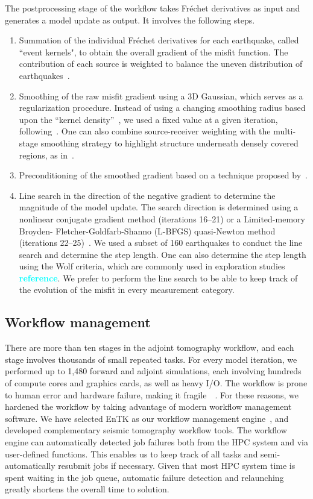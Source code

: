 \documentclass[extra,mreferee]{gji}
\newcommand{\cyan}[1]{\textbf{\textcolor{Cyan}{#1}}}
\begin{document}
The postprocessing stage of the workflow takes Fr\'echet derivatives as input and
generates a model update as output.
It involves the following steps.
\begin{enumerate}
  \item Summation of the individual Fr\'echet derivatives for each earthquake, called ``event kernels", to obtain the overall gradient of the misfit function. The contribution of each source is weighted to balance
    the uneven distribution of earthquakes~\citep{Ruanetal2018}.
  \item Smoothing of the raw misfit gradient using a 3D Gaussian, which
    serves as a regularization procedure. Instead of using a changing
    smoothing radius based upon the ``kernel density''~\citep{bozdaug2016global},
    we used a fixed value at a given iteration, following~\cite{zhu2012structure}. One can also combine source-receiver weighting with the multi-stage smoothing strategy to highlight structure underneath densely covered regions, as in~\citet{bozdaug2016global}.
  \item Preconditioning of the smoothed gradient based on a technique proposed by~\cite{luo2013strategies}.
  \item Line search in the direction of the negative gradient to determine the magnitude of the model update.
  The search direction is determined using a nonlinear conjugate gradient method (iterations 16--21) or a Limited-memory Broyden- Fletcher-Goldfarb-Shanno (L-BFGS) quasi-Newton method (iterations 22--25)~\citep{wright1999numerical}.
  We used a subset of 160 earthquakes to conduct the line search and determine the step length. One can also determine the step length using the Wolf criteria, which are commonly used in exploration studies \cyan{reference}. We prefer to perform the line search to be able to keep track of the evolution of the misfit in every measurement category.
\end{enumerate}

\subsection{Workflow management}

There are more than ten stages in the adjoint tomography workflow,
and each stage involves thousands of small repeated tasks.
For every model iteration,
we performed up to 1,480 forward and adjoint simulations, each involving hundreds of
compute cores and graphics cards, as well as heavy I/O.
The workflow is prone to human error and hardware failure, making it fragile~~\citep{Lefebvre2018}.
For these reasons, we hardened the workflow by taking advantage of modern
workflow management software.
We have selected EnTK as our
workflow management engine~\citep{EnTK2017}, and developed complementary seismic tomography
workflow tools.
The workflow engine can automatically detected job failures both from the
HPC system and via user-defined functions. This enables us to keep track of
all tasks and semi-automatically resubmit jobs if necessary.
Given that most HPC system time is spent waiting in the job queue, automatic
failure detection and relaunching greatly shortens the overall time to solution.
\end{document}
